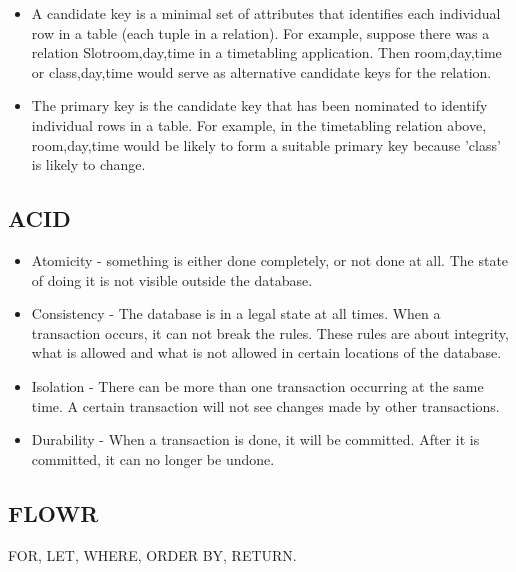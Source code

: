 \documentclass[10pt]{article}
\begin{document}
\begin{itemize}
      \item A candidate key is a minimal set of attributes that identifies each individual
      row in a table (each tuple in a relation). For example, suppose there was a
      relation Slotroom,day,time in a timetabling application. Then room,day,time or
      class,day,time would serve as alternative candidate keys for the relation.

      \item The primary key is the candidate key that has been nominated to identify individual
      rows in a table. For example, in the timetabling relation above, room,day,time
      would be likely to form a suitable primary key because ’class’ is likely to change.
    \end{itemize}

    \subsection*{ACID}
      \begin{itemize}
        \item Atomicity - something is either done completely, or not done at all. The state of doing it is not visible outside the database.
        \item Consistency - The database is in a legal state at all times. When a transaction occurs, it can not break the rules. These rules are about integrity, what is allowed and what is not allowed in certain locations of the database.
        \item Isolation - There can be more than one transaction occurring at the same time. A certain transaction will not see changes made by other transactions.
        \item Durability - When a transaction is done, it will be committed. After it is committed, it can no longer be undone.
      \end{itemize}

    \subsection*{FLOWR}
       FOR, LET, WHERE, ORDER BY, RETURN.

    
\end{document}
